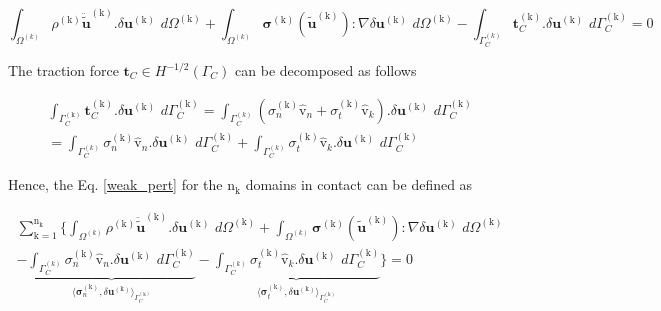 \begin{equation} \label{weak_pert}
\int_{\Omega^{(k)}}\rho^\mathrm{(k)}\bm{\ddot{\widetilde{u}}}^\mathrm{(k)}. \delta\bm u^\mathrm{(k)} \,\,d\Omega^\mathrm{(k)} +\int_{\Omega^{(k)}} \bm{\sigma}^\mathrm{(k)}(\bm{\widetilde u}^\mathrm{(k)}) : \nabla\delta\bm u^\mathrm{(k)} \,\,d\Omega^\mathrm{(k)} - \int_{\Gamma^{(k)}_C} \bm t_C^\mathrm{(k)}  .  \delta\bm u^\mathrm{(k)} \,\,d\Gamma_{C}^\mathrm{(k)} = 0 
\end{equation}
 
The traction force $\bm t_C \in H^{-{1}/{2}}(\Gamma_C)$ can be decomposed as follows

\begin{equation}
\begin{split}
 \int_{\Gamma^{(\mathrm k)}_C}  \bm t_C^\mathrm{(k)}  .  \delta\bm u^\mathrm{(\mathrm k)}  \,\,d\Gamma_{C}^\mathrm{(k)} = \int_{\Gamma^{(k)}_C} ( \sigma_n^{(\mathrm k)} \bm{\hat{\mathrm v}}_n+  \sigma_t^{(\mathrm k)}\bm{\hat{\mathrm v}}_k) .
 \delta\bm u^\mathrm{(k)} \,\,d\Gamma_{C}^\mathrm{(k)}\\ 
 =  {\int_{\Gamma^{(k)}_C}  \sigma_n^{(\mathrm k)} \bm{\hat{\mathrm v}}_n. \delta\bm u^\mathrm{(k)}} \,\,d\Gamma_{C}^\mathrm{(k)}+ {\int_{\Gamma^{(k)}_C}  \sigma_t^{(\mathrm k)} \bm{\hat{\mathrm v}}_k. \delta\bm u^\mathrm{(k)}} \,\,d\Gamma_{C}^\mathrm{(k)}
 \end{split}
\end{equation}

Hence, the Eq. \eqref{weak_pert} for the $\mathrm n_{\mathrm k}$ domains in contact can be defined as 

\begin{multline} 
\sum_{\mathrm{k}=1}^{\mathrm{n}_{\mathrm{\mathrm{k}}}}   \bigg\{  \int_{\Omega^{(k)}}\rho^\mathrm{(k)}\bm{\ddot{\widetilde{u}}}^\mathrm{(k)}. \delta\bm u^\mathrm{(k)} \,\,d\Omega^\mathrm{(k)}+\int_{\Omega^{(k)}} \bm{\sigma}^\mathrm{(k)}(\bm{\widetilde u}^\mathrm{(k)}) : \nabla \delta\bm u^\mathrm{(k)} \,\,d\Omega^\mathrm{(k)}\\  -    \underbrace{\int_{\Gamma^{(k)}_C}  \sigma_n^{(\mathrm k)} \bm{\hat{\mathrm v}}_n. \delta\bm u^\mathrm{(k)}  \,\,d\Gamma_{C}^\mathrm{(k)}}_{\langle \bm{\sigma}^{\mathrm{(k)}}_n, \delta \bm u^{\mathrm{(k)}} \rangle_{\Gamma_C^{\mathrm{(k)}}}} - \underbrace{\int_{\Gamma^{(k)}_C}  \sigma_t^{(\mathrm k)} \bm{\hat{\mathrm v}}_k. \delta\bm u^\mathrm{(k)}  \,\,d\Gamma_{C}^\mathrm{(k)}}_{\langle \bm{\sigma}^{\mathrm{(k)}}_t, \delta \bm u^{\mathrm{(k)}} \rangle_{\Gamma_C^{\mathrm{(k)}}}} \bigg\} = 0 
\end{multline}\label{weak_pert_1}

